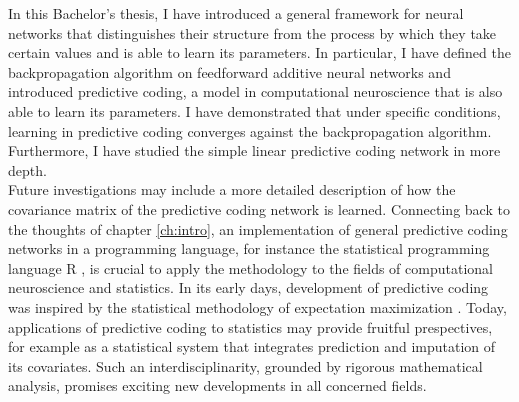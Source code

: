 \documentclass[a4paper,11pt]{report}
\begin{document}
In this Bachelor's thesis, I have introduced a general framework for neural networks that distinguishes their structure from the process by which they take certain values and is able to learn its parameters. In particular, I have defined the backpropagation algorithm on feedforward additive neural networks and introduced predictive coding, a model in computational neuroscience that is also able to learn its parameters. I have demonstrated that under specific conditions, learning in predictive coding converges against the backpropagation algorithm. Furthermore, I have studied the simple linear predictive coding network in more depth.\\
Future investigations may include a more detailed description of how the covariance matrix of the predictive coding network is learned. Connecting back to the thoughts of chapter \ref{ch:intro}, an implementation of general predictive coding networks in a programming language, for instance the statistical programming language R \cite{R}, is crucial to apply the methodology to the fields of computational neuroscience and statistics. In its early days, development of predictive coding was inspired by the statistical methodology of expectation maximization \cite{Friston2005, Dempster1977}. Today, applications of predictive coding to statistics may provide fruitful prespectives, for example as a statistical system that integrates prediction and imputation of its covariates. Such an interdisciplinarity, grounded by rigorous mathematical analysis, promises exciting new developments in all concerned fields.

\printbibliography
\end{document}
